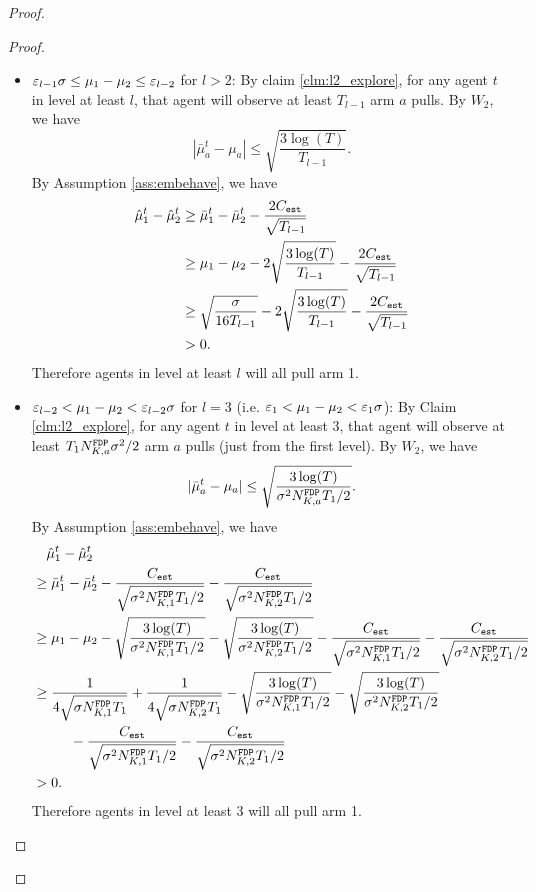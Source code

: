 \begin{proof}
\begin{proof}
\begin{itemize}
\item $\varepsilon_{l-1} \NG \leq \mu_1 - \mu_2 \leq \varepsilon_{l-2}$ for $l > 2$: By claim \ref{clm:l2_explore}, for any agent $t$ in level at least $l$, that agent will observe at least $T_{l-1}$ arm $a$ pulls. By $W_2$, we have
\[
|\bar{\mu}_a^t - \mu_a| \leq \sqrt{\frac{3\log(T)}{T_{l-1}}}.
\]
By Assumption \ref{ass:embehave}, we have
\begin{align*}
\hat{\mu}_1^t - \hat{\mu}_2^t &\geq \bar{\mu}_1^t - \bar{\mu}_2^t - \frac{2\estC}{\sqrt{T_{l-1}}} \\
&\geq \mu_1 -\mu_2 - 2 \sqrt{\frac{3\log(T)}{T_{l-1}}}- \frac{2\estC}{\sqrt{T_{l-1}}} \\
&\geq\sqrt{\frac{\NG}{16T_{l-1}}} -  2 \sqrt{\frac{3\log(T)}{T_{l-1}}}- \frac{2\estC}{\sqrt{T_{l-1}}} \\
&>0.
\end{align*}
Therefore agents in level at least $l$ will all pull arm 1. 

\item $\varepsilon_{l-2} < \mu_1 - \mu_2 < \varepsilon_{l-2}\NG$ for $l =3$ (i.e. $\varepsilon_1 < \mu_1 - \mu_2 < \varepsilon_1\NG$): By Claim \ref{clm:l2_explore}, for any agent $t$ in level at least $3$, that agent will observe at least $T_1\fdpN \NG^2/2$ arm $a$ pulls (just from the first level). By $W_2$, we have
\[
|\bar{\mu}_a^t - \mu_a| \leq \sqrt{\frac{3\log(T)}{\NG^2\fdpN T_1/2}}.
\]
By Assumption \ref{ass:embehave}, we have
\begin{align*}
&~~~\hat{\mu}_1^t - \hat{\mu}_2^t\\
 &\geq \bar{\mu}_1^t - \bar{\mu}_2^t - \frac{\estC}{\sqrt{\NG^2\fdpN[1]T_1/2}}-\frac{\estC}{\sqrt{\NG^2\fdpN[2]T_1/2}}  \\
&\geq \mu_1 -\mu_2 -  \sqrt{\frac{3\log(T)}{\NG^2\fdpN[1]T_1/2}}- \sqrt{\frac{3\log(T)}{\NG^2\fdpN[2]T_1/2}}- \frac{\estC}{\sqrt{\NG^2\fdpN[1]T_1/2}}-\frac{\estC}{\sqrt{\NG^2\fdpN[2]T_1/2}}  \\
&\geq\frac{1}{4\sqrt{\NG\fdpN[1]T_1}} + \frac{1}{4\sqrt{\NG\fdpN[2]T_1}}  -  \sqrt{\frac{3\log(T)}{\NG^2\fdpN[1]T_1/2}}- \sqrt{\frac{3\log(T)}{\NG^2\fdpN[2]T_1/2}}\\
&~~~~~~~~- \frac{\estC}{\sqrt{\NG^2\fdpN[1]T_1/2}}-\frac{\estC}{\sqrt{\NG^2\fdpN[2]T_1/2}}  \\
&>0.
\end{align*}
Therefore agents in level at least 3 will all pull arm 1. 


\end{itemize}
\end{proof}
\end{proof}
